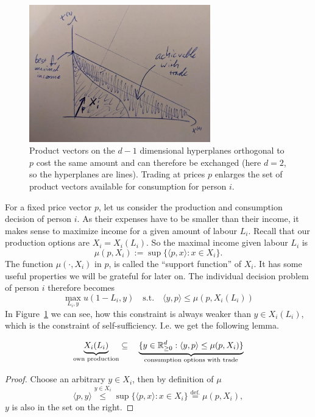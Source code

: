 \begin{figure}
	\centering
	\includegraphics[width=0.7\textwidth]{images/consumption_increase_by_trade.jpeg}
	\caption{
		Product vectors on the \(d-1\) dimensional hyperplanes orthogonal to \(p\)
		cost the same amount and can therefore be exchanged (here \(d=2\), so the
		hyperplanes are lines). Trading at prices \(p\) enlarges the set of
		product vectors available for consumption for person \(i\).
	}
	\label{fig: consumption increase by trade}
\end{figure}
For a fixed price vector \(p\), let us consider the production and consumption
decision of person \(i\). As their expenses have to be smaller than their
income, it makes sense to maximize income for a given amount of labour \(L_i\).
Recall that our production options are \(X_i=X_i(L_i)\). So the maximal income
given labour \(L_i\) is
\[
	\tag{income}\label{eq: income}
	\mu(p, X_i) := \sup\{\langle p, x\rangle : x\in X_i\}.
\]
The function \(\mu(\cdot, X_i)\) in \(p\), is called the ``support function'' of
\(X_i\). It has some useful properties we will be grateful for later on. The
individual decision problem of person \(i\) therefore becomes
\begin{equation}
	\tag{IDP}
	\label{eq: individual decision problem}
	\max_{L_i, y} u(1-L_i, y) \quad\text{s.t.}\quad
	\langle y, p\rangle \le \mu(p, X_i(L_i))
\end{equation}
In Figure~\ref{fig: consumption increase by trade} we can see, how this
constraint is always weaker than \(y\in X_i(L_i)\), which is the constraint of
self-sufficiency. I.e. we get the following lemma.

\begin{lemma}
\[
	\underbrace{X_i(L_i)}_{\text{own production}}
	\subseteq \quad
	\underbrace{
		\{y\in\mathbb{R}_{\ge 0}^d: \langle y, p\rangle \le \mu(p, X_i)\}
	}_{\text{consumption options with trade}}
\]
\end{lemma}
\begin{proof}
	Choose an arbitrary \(y\in X_i\), then by definition of \(\mu\)
	\[
		\langle p, y\rangle \overset{y\in X_i}\le \sup\{\langle p, x\rangle : x\in
		X_i\} \overset{\text{def.}}= \mu(p, X_i),
	\]
	\(y\) is also in the set on the right.
\end{proof}


